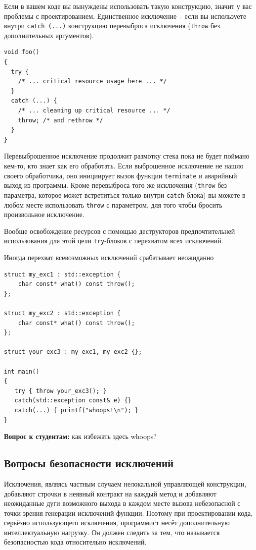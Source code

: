 \documentclass[a4paper,12pt,oneside]{article}
\newif\ifanswers
\begin{document}
Если в вашем коде вы вынуждены использовать такую конструкцию, значит у вас проблемы с проектированием. Единственное исключение -- если вы используете внутри \lstinline!catch (...)! конструкцию перевыброса исключения (\lstinline!throw! без дополнительных аргументов).

\begin{lstlisting}
void foo()
{
  try {
    /* ... critical resource usage here ... */
  }
  catch (...) {
    /* ... cleaning up critical resource ... */
    throw; /* and rethrow */
  }
}
\end{lstlisting}

Перевыброшенное исключение продолжит размотку стека пока не будет поймано кем-то, кто знает как его обработать. Если выброшенное исключение не нашло своего обработчика, оно инициирует вызов функции \lstinline!terminate! и аварийный выход из программы. Кроме перевыброса того же исключения (\lstinline!throw! без параметра, которое может встретиться только внутри \lstinline!catch!-блока) вы можете в любом месте использовать \lstinline!throw! с параметром, для того чтобы бросить произвольное исключение. 

Вообще освобождение ресурсов с помощью деструкторов предпочтительней использования для этой цели \lstinline!try!-блоков с перехватом всех исключений.

Иногда перехват всевозможных исключений срабатывает неожиданно

\begin{lstlisting}
struct my_exc1 : std::exception { 
    char const* what() const throw(); 
};

struct my_exc2 : std::exception { 
    char const* what() const throw(); 
};

struct your_exc3 : my_exc1, my_exc2 {};

int main()
{
   try { throw your_exc3(); }
   catch(std::exception const& e) {}
   catch(...) { printf("whoops!\n"); }
}
\end{lstlisting}

\textbf{Вопрос к студентам:} как избежать здесь whoops?

\ifanswers
Правильный ответ: виртуальное наследование.
\fi

\pagebreak
\subsection{Вопросы безопасности исключений}\label{ExceptionSafety}

Исключения, являясь частным случаем нелокальной управляющей конструкции, добавляют строчки в неявный контракт на каждый метод и добавляют неожиданные дуги возможного выхода в каждом месте вызова небезопасной с точки зрения генерации исключений функции. Поэтому при проектировании кода, серьёзно использующего исключения, программист несёт дополнительную интеллектуальную нагрузку. Он должен следить за тем, что называется безопасностью кода относительно исключений.
\end{document}
